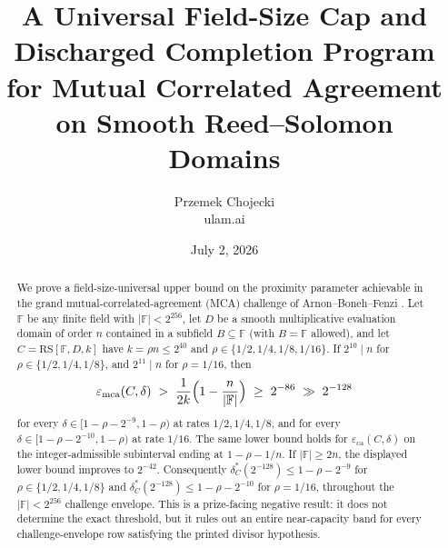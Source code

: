 \documentclass[11pt]{article}
\title{A Universal Field-Size Cap and Discharged Completion Program\\ for Mutual Correlated Agreement on Smooth Reed--Solomon Domains}
\author{Przemek Chojecki\\ \small ulam.ai}
\date{July 2, 2026}
\theoremstyle{definition}
\theoremstyle{remark}
\newcommand{\F}{\mathbb{F}}
\newcommand{\B}{B}
\newcommand{\RS}{\mathrm{RS}}
\newcommand{\eca}{\varepsilon_{\mathrm{ca}}}
\newcommand{\emca}{\varepsilon_{\mathrm{mca}}}
\begin{document}
\maketitle

\begin{abstract}
We prove a field-size-universal upper bound on the proximity parameter achievable in the grand mutual-correlated-agreement (MCA) challenge of Arnon--Boneh--Fenzi \cite{ABF26}. Let $\F$ be any finite field with $|\F|<2^{256}$, let $D$ be a smooth multiplicative evaluation domain of order $n$ contained in a subfield $\B\subseteq\F$ (with $\B=\F$ allowed), and let $C=\RS[\F,D,k]$ have $k=\rho n\le2^{40}$ and $\rho\in\{1/2,1/4,1/8,1/16\}$. If $2^{10}\mid n$ for $\rho\in\{1/2,1/4,1/8\}$, and $2^{11}\mid n$ for $\rho=1/16$, then
\[
\emca(C,\delta)
\;>\;\frac{1}{2k}\Bigl(1-\frac n{|\F|}\Bigr)
\;\ge\;2^{-86}\;\gg\;2^{-128}
\]
for every $\delta\in[1-\rho-2^{-9},1-\rho)$ at rates $1/2,1/4,1/8$, and for every $\delta\in[1-\rho-2^{-10},1-\rho)$ at rate $1/16$. The same lower bound holds for $\eca(C,\delta)$ on the integer-admissible subinterval ending at $1-\rho-1/n$. If $|\F|\ge2n$, the displayed lower bound improves to $2^{-42}$. Consequently $\delta^*_C(2^{-128})\le 1-\rho-2^{-9}$ for $\rho\in\{1/2,1/4,1/8\}$ and $\delta^*_C(2^{-128})\le 1-\rho-2^{-10}$ for $\rho=1/16$, throughout the $|\F|<2^{256}$ challenge envelope. This is a prize-facing negative result: it does not determine the exact threshold, but it rules out an entire near-capacity band for every challenge-envelope row satisfying the printed divisor hypothesis.


\end{abstract}
\end{document}
